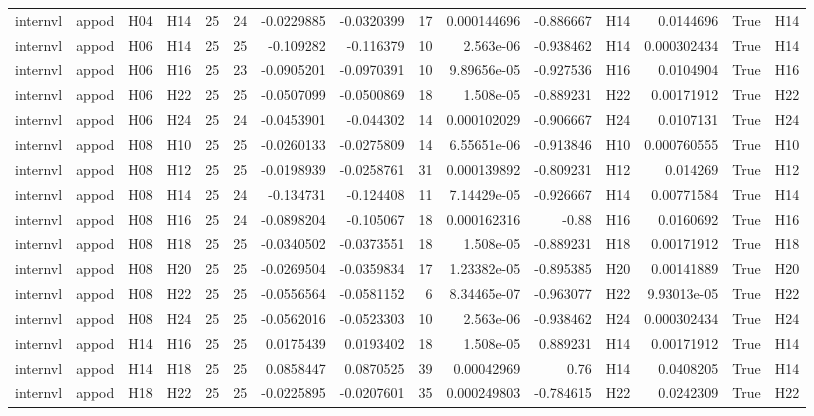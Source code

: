 \begin{longtable}{llllrrrrrrrlrrl}
internvl & appod & H04 & H14 & 25 & 24 & -0.0229885 & -0.0320399 & 17 & 0.000144696 & -0.886667 & H14 & 0.0144696 & True & H14 \\
internvl & appod & H06 & H14 & 25 & 25 & -0.109282 & -0.116379 & 10 & 2.563e-06 & -0.938462 & H14 & 0.000302434 & True & H14 \\
internvl & appod & H06 & H16 & 25 & 23 & -0.0905201 & -0.0970391 & 10 & 9.89656e-05 & -0.927536 & H16 & 0.0104904 & True & H16 \\
internvl & appod & H06 & H22 & 25 & 25 & -0.0507099 & -0.0500869 & 18 & 1.508e-05 & -0.889231 & H22 & 0.00171912 & True & H22 \\
internvl & appod & H06 & H24 & 25 & 24 & -0.0453901 & -0.044302 & 14 & 0.000102029 & -0.906667 & H24 & 0.0107131 & True & H24 \\
internvl & appod & H08 & H10 & 25 & 25 & -0.0260133 & -0.0275809 & 14 & 6.55651e-06 & -0.913846 & H10 & 0.000760555 & True & H10 \\
internvl & appod & H08 & H12 & 25 & 25 & -0.0198939 & -0.0258761 & 31 & 0.000139892 & -0.809231 & H12 & 0.014269 & True & H12 \\
internvl & appod & H08 & H14 & 25 & 24 & -0.134731 & -0.124408 & 11 & 7.14429e-05 & -0.926667 & H14 & 0.00771584 & True & H14 \\
internvl & appod & H08 & H16 & 25 & 24 & -0.0898204 & -0.105067 & 18 & 0.000162316 & -0.88 & H16 & 0.0160692 & True & H16 \\
internvl & appod & H08 & H18 & 25 & 25 & -0.0340502 & -0.0373551 & 18 & 1.508e-05 & -0.889231 & H18 & 0.00171912 & True & H18 \\
internvl & appod & H08 & H20 & 25 & 25 & -0.0269504 & -0.0359834 & 17 & 1.23382e-05 & -0.895385 & H20 & 0.00141889 & True & H20 \\
internvl & appod & H08 & H22 & 25 & 25 & -0.0556564 & -0.0581152 & 6 & 8.34465e-07 & -0.963077 & H22 & 9.93013e-05 & True & H22 \\
internvl & appod & H08 & H24 & 25 & 25 & -0.0562016 & -0.0523303 & 10 & 2.563e-06 & -0.938462 & H24 & 0.000302434 & True & H24 \\
internvl & appod & H14 & H16 & 25 & 25 & 0.0175439 & 0.0193402 & 18 & 1.508e-05 & 0.889231 & H14 & 0.00171912 & True & H14 \\
internvl & appod & H14 & H18 & 25 & 25 & 0.0858447 & 0.0870525 & 39 & 0.00042969 & 0.76 & H14 & 0.0408205 & True & H14 \\
internvl & appod & H18 & H22 & 25 & 25 & -0.0225895 & -0.0207601 & 35 & 0.000249803 & -0.784615 & H22 & 0.0242309 & True & H22 \\

\end{longtable}
